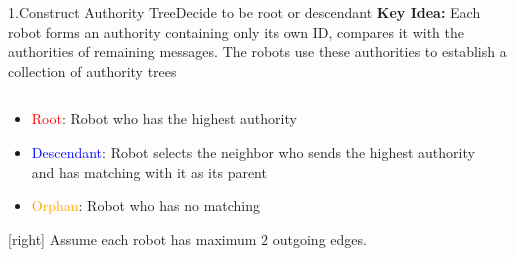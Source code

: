 \begin{frame}{1.Construct Authority Tree}{Decide to be root or descendant}
  \textbf{Key Idea:} Each robot forms an authority containing only its
  own ID, compares it with the authorities of remaining messages. The
  robots use these authorities to establish a collection of authority
  trees
  \begin{columns}[T] %
    \begin{column}{.45\textwidth}
      \begin{itemize}
      \item {\textcolor{red}{Root}: Robot who has the highest authority}
      \item {\textcolor{blue}{Descendant}: Robot selects the neighbor who sends
          the highest authority and has matching with it as its parent}
      \item {\textcolor{orange}{Orphan}: Robot who has no matching}
      \end{itemize}  
      \footnotesize{[right] Assume each robot has maximum $2$ outgoing
        edges.}
    \end{column}%
    \begin{column}{.5\textwidth}
       
    \end{column}
  \end{columns}
\end{frame}